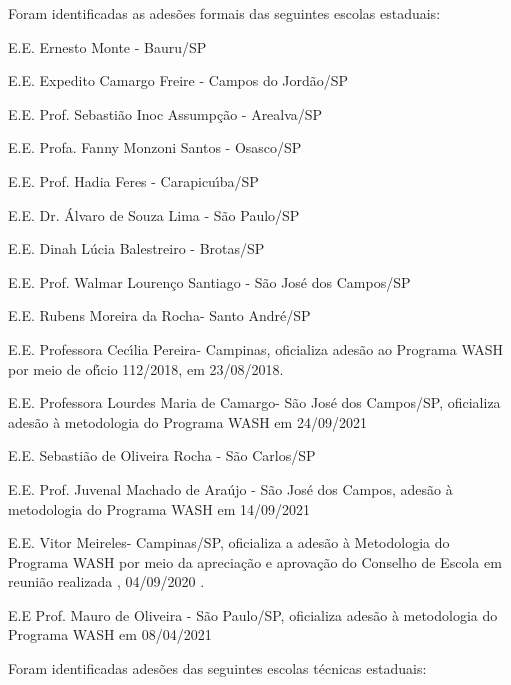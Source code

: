 \documentclass[
12pt,		%
openright,	%
twoside,  %
a4paper,			%
chapter=TITLE,		%
english,			%
french,				%
spanish,			%
brazil				%
]{USPSC-classe/USPSC}
\begin{document}
Foram identificadas as ades\~oes formais das seguintes escolas estaduais:









\begin{alineas}
\item E.E. Ernesto Monte - Bauru/SP
\item E.E. Expedito Camargo Freire - Campos do Jord\~ao/SP
\item E.E. Prof. Sebasti\~ao Inoc Assump\c{c}\~ao - Arealva/SP
\item E.E. Profa. Fanny Monzoni Santos - Osasco/SP
\item E.E. Prof. Hadia Feres - Carapicu\'{\i}ba/SP
\item E.E. Dr. \'Alvaro de Souza Lima - S\~ao Paulo/SP
\item E.E. Dinah L\'ucia Balestreiro - Brotas/SP  
\item E.E. Prof. Walmar Louren\c{c}o Santiago - S\~ao Jos\'e dos Campos/SP
\item E.E. Rubens Moreira da Rocha- Santo Andr\'e/SP
\item E.E. Professora Cec\'{\i}lia Pereira- Campinas, oficializa ades\~ao ao Programa WASH por meio de of\'{\i}cio 112/2018, em 23/08/2018.
\item E.E. Professora Lourdes Maria de Camargo- S\~ao Jos\'e dos Campos/SP, oficializa ades\~ao \`a metodologia do Programa WASH em 24/09/2021
\item E.E. Sebasti\~ao de Oliveira Rocha - S\~ao Carlos/SP
\item E.E. Prof. Juvenal Machado de Ara\'ujo - S\~ao Jos\'e dos Campos, ades\~ao \`a metodologia do Programa WASH em 14/09/2021
\item E.E. Vitor Meireles- Campinas/SP, oficializa a ades\~ao \`a Metodologia do Programa WASH  por meio da aprecia\c{c}\~ao e aprova\c{c}\~ao do Conselho de Escola em reuni\~ao realizada , 04/09/2020 .
\item E.E Prof. Mauro de Oliveira - S\~ao Paulo/SP, oficializa ades\~ao \`a metodologia do Programa WASH em 08/04/2021
\end{alineas}

Foram identificadas ades\~oes das seguintes escolas t\'ecnicas estaduais:
\end{document}
